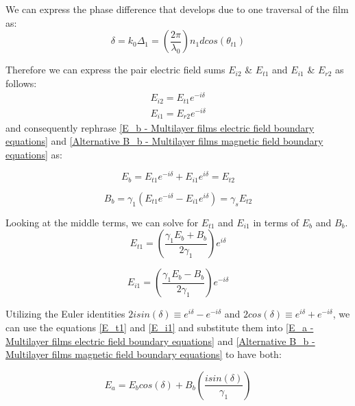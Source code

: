 We can express the phase difference that develops due to one traversal of the film as:
    \begin{equation} \label{phase difference}
    \delta = k_0\Delta_1 = \left(\frac{2\pi}{\lambda_0}\right) n_1dcos(\theta_{t1})
    \end{equation}

Therefore we can express the pair electric field sums $E_{i2}$ \& $E_{t1}$ and $E_{i1}$ \& $E_{r2}$ as follows:
    \begin{align*}
        E_{i2} = E_{t1}e^{-i\delta} \\
        E_{i1} = E_{r2}e^{-i\delta}
    \end{align*}
and consequently rephrase \ref{E_b - Multilayer films electric field boundary equations} and \ref{Alternative B_b - Multilayer films magnetic field boundary equations} as:

    \begin{equation} \label{E_b form after phase difference}
    E_b = E_{t1}e^{-i\delta} + E_{i1}e^{i\delta} = E_{t2}
    \end{equation}
    
    \begin{equation} \label{B_b form after phase difference}
    B_b = \gamma_1(E_{t1}e^{-i\delta} - E_{i1}e^{i\delta}) = \gamma_sE_{t2}
    \end{equation}

Looking at the middle terms, we can solve for $E_{t1}$ and $E_{i1}$ in terms of $E_b$ and $B_b$.
    \begin{equation} \label{E_t1}
    E_{t1} = \left(\frac{\gamma_1E_b + B_b}{2\gamma_1}\right)e^{i\delta}
    \end{equation}
    
    \begin{equation} \label{E_i1}
    E_{i1} = \left(\frac{\gamma_1E_b - B_b}{2\gamma_1}\right)e^{-i\delta}
    \end{equation}

Utilizing the Euler identities $2isin(\delta) \equiv e^{i\delta} - e^{-i\delta}$ and $2cos(\delta) \equiv e^{i\delta} + e^{-i\delta}$, we can use the equations \ref{E_t1} and \ref{E_i1} and substitute them into \ref{E_a - Multilayer films electric field boundary equations} and \ref{Alternative B_b - Multilayer films magnetic field boundary equations} to have both:

    \begin{equation} \label{E_a in terms of E_b and B_b}
    E_a = E_bcos(\delta) + B_b\left(\frac{isin(\delta)}{\gamma_1}\right)
    \end{equation}
    
